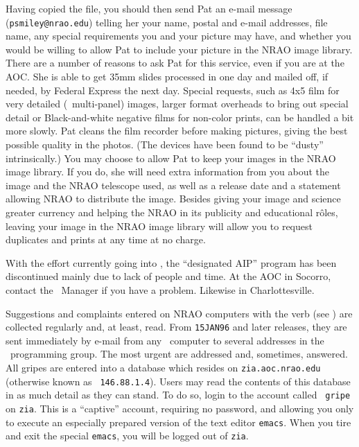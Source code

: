      Having copied the file, you should then send Pat an e-mail
message ({\tt psmiley@nrao.edu}) telling her your name, postal and
e-mail addresses, file name, any special requirements you and your
picture may have, and whether you would be willing to allow Pat to
include your picture in the NRAO image library.  There are a number of
reasons to ask Pat for this service, even if you are at the
\hbox{AOC}.  She is able to get 35mm slides processed in one day and
mailed off, if needed, by Federal Express the next day.  Special
requests, such as 4x5 film for very detailed (\eg\ multi-panel) images,
larger format overheads to bring out special detail or Black-and-white
negative films for non-color prints, can be handled a bit more slowly.
Pat cleans the film recorder before making pictures, giving the best
possible quality in the photos.  (The devices have been found to be
``dusty'' intrinsically.)  You may choose to allow Pat to keep your
images in the NRAO image library.  If you do, she will need extra
information from you about the image and the NRAO telescope used, as
well as a release date and a statement allowing NRAO to distribute the
image.  Besides giving your image and science greater currency and
helping the NRAO in its publicity and educational r\^oles, leaving
your image in the NRAO image library will allow you to request
duplicates and prints at any time at no charge.


    With the effort currently going into \AIPTOO, the ``designated
AIP'' program has been discontinued mainly due to lack of people and
time.  At the AOC in Socorro, contact the \AIPS\ Manager if you have a
problem.  Likewise in Charlottesville.

     Suggestions and complaints entered on NRAO computers with the
{\tt {}} verb (see ) are collected regularly and,
at least, read.  From {\tt 15JAN96} and later releases, they are sent
immediately by e-mail from any \AIPS\ computer to several addresses in
the \AIPS\ programming group.  The most urgent are addressed and,
sometimes, answered. All gripes are entered into a database which
resides on {\tt zia.aoc.nrao.edu} (otherwise known as {\tt
146.88.1.4}).  Users may read the contents of this database in as much
detail as they can stand.  To do so, login to the account called {\tt
gripe} on {\tt zia}.  This is a ``captive'' account, requiring no
password, and allowing you only to execute an especially prepared
version of the text editor {\tt emacs}.  When you tire and exit the
special {\tt emacs}, you will be logged out of {\tt zia}.

